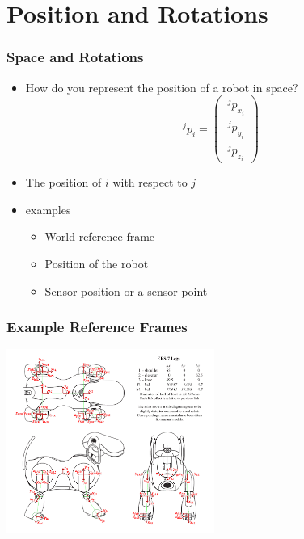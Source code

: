 \documentclass[10pt]{beamer}
\begin{document}
\section{Position and Rotations}

\begin{frame}
  \frametitle{Space and Rotations}
  \begin{itemize}
  \item How do you represent the position of a robot in space?
    \pause 
    \begin{equation*}
      ~^{j}p_{i} = \left( \begin{array}{c} ~^{j}p_{x_i} \\ ~^{j}p_{y_i} \\ ~^{j}p_{z_i}  \end{array} \right)
    \end{equation*}
  \item The position of $i$ with respect to $j$
  \item examples
    \begin{itemize}
    \item World reference frame
    \item Position of the robot
    \item Sensor position or a sensor point
    \end{itemize}
  \end{itemize}
\end{frame}

\begin{frame}
  \frametitle{Example Reference Frames}
  \centerline{\includegraphics[height=6cm]{sony-trfs}}
\end{frame}
  
\end{document}

